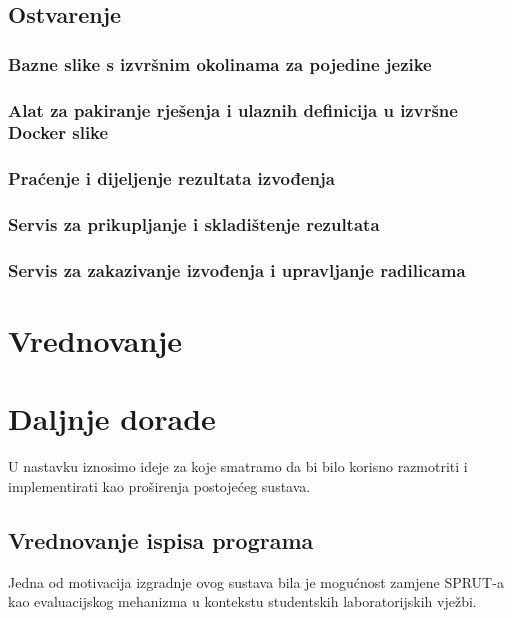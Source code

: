\documentclass[times, utf8, zavrsni]{fer}
\begin{document}
\section{Ostvarenje}

\subsection{Bazne slike s izvršnim okolinama za pojedine jezike}

\subsection{Alat za pakiranje rješenja i ulaznih definicija u izvršne Docker slike}

\subsection{Praćenje i dijeljenje rezultata izvođenja}

\subsection{Servis za prikupljanje i skladištenje rezultata}

\subsection{Servis za zakazivanje izvođenja i upravljanje radilicama}

\chapter{Vrednovanje}

\chapter{Daljnje dorade}

U nastavku iznosimo ideje za koje smatramo da bi bilo korisno razmotriti i implementirati kao proširenja postojećeg sustava.

\section{Vrednovanje ispisa programa}

Jedna od motivacija izgradnje ovog sustava bila je mogućnost zamjene SPRUT-a kao evaluacijskog mehanizma u kontekstu studentskih laboratorijskih vježbi.
\end{document}
